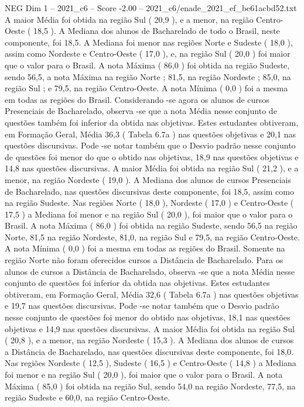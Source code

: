 \begin{textsample}{NEG Dim 1 – 2021\_c6 – Score -2.00 – 2021\_c6/enade\_2021\_ef\_be61acbd52.txt}
A maior Média foi obtida na região Sul ( 20,9 ), e a menor, na região Centro-Oeste ( 18,5 ).
A Mediana dos alunos de Bacharelado de todo o Brasil, neste componente, foi 18,5.
A Mediana foi menor nas regiões Norte e Sudeste ( 18,0 ), assim como Nordeste e Centro-Oeste ( 17,0 ), e, na região Sul ( 20,0 ) foi maior que o valor para o Brasil.
A nota Máxima ( 86,0 ) foi obtida na região Sudeste, sendo 56,5, a nota Máxima na região Norte ; 81,5, na região Nordeste ; 85,0, na região Sul ; e 79,5, na região Centro-Oeste.
A nota Mínima ( 0,0 ) foi a mesma em todas as regiões do Brasil.
Considerando -se agora os alunos de cursos Presenciais de Bacharelado, observa -se que a nota Média nesse conjunto de questões também foi inferior da obtida nas objetivas.
Estes estudantes obtiveram, em Formação Geral, Média 36,3 ( Tabela 6.7a ) nas questões objetivas e 20,1 nas questões discursivas.
Pode -se notar também que o Desvio padrão nesse conjunto de questões foi menor do que o obtido nas objetivas, 18,9 nas questões objetivas e 14,8 nas questões discursivas.
A maior Média foi obtida na região Sul ( 21,2 ), e a menor, na região Nordeste ( 19,0 ).
A Mediana dos alunos de cursos Presenciais de Bacharelado, nas questões discursivas deste componente, foi 18,5, assim como na região Sudeste.
Nas regiões Norte ( 18,0 ), Nordeste ( 17,0 ) e Centro-Oeste ( 17,5 ) a Mediana foi menor e na região Sul ( 20,0 ), foi maior que o valor para o Brasil.
A nota Máxima ( 86,0 ) foi obtida na região Sudeste, sendo 56,5 na região Norte, 81,5 na região Nordeste, 81,0, na região Sul e 79,5, na região Centro-Oeste.
A nota Mínima ( 0,0 ) foi a mesma em todas as regiões do Brasil.
Somente na região Norte não foram oferecidos cursos a Distância de Bacharelado.
Para os alunos de cursos a Distância de Bacharelado, observa -se que a nota Média nesse conjunto de questões foi inferior da obtida nas objetivas.
Estes estudantes obtiveram, em Formação Geral, Média 32,6 ( Tabela 6.7a ) nas questões objetivas e 19,7 nas questões discursivas.
Pode -se notar também que o Desvio padrão nesse conjunto de questões foi menor do obtido nas objetivas, 18,1 nas questões objetivas e 14,9 nas questões discursivas.
A maior Média foi obtida na região Sul ( 20,8 ), e a menor, na região Nordeste ( 15,3 ).
A Mediana dos alunos de cursos a Distância de Bacharelado, nas questões discursivas deste componente, foi 18,0.
Nas regiões Nordeste ( 12,5 ), Sudeste ( 16,5 ) e Centro-Oeste ( 14,8 ) a Mediana foi menor e na região Sul ( 20,0 ), foi maior que o valor para o Brasil.
A nota Máxima ( 85,0 ) foi obtida na região Sul, sendo 54,0 na região Nordeste, 77,5, na região Sudeste e 60,0, na região Centro-Oeste.

\end{textsample}
